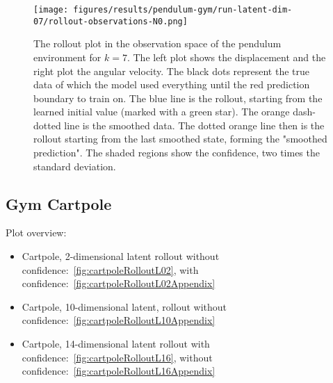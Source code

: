 		\begin{figure}
			\centering
			\texttt{[image: figures/results/pendulum-gym/run-latent-dim-07/rollout-observations-N0.png]}
			\caption[Rollout of the Gym pendulum experiment for 7 latent dimensions]{The rollout plot in the observation space of the pendulum environment for \(k = 7\). The left plot shows the displacement and the right plot the angular velocity. The black dots represent the true data of which the model used everything until the red prediction boundary to train on. The blue line is the rollout, starting from the learned initial value (marked with a green star). The orange dash-dotted line is the smoothed data. The dotted orange line then is the rollout starting from the last smoothed state, forming the "smoothed prediction". The shaded regions show the confidence, \ie two times the standard deviation.}
			\label{fig:gymPendulumRolloutL7}
		\end{figure}

	\subsection{Gym Cartpole}
		Plot overview:
		\begin{itemize}
			\item Cartpole, 2-dimensional latent rollout without confidence:~\autoref{fig:cartpoleRolloutL02}, with confidence:~\autoref{fig:cartpoleRolloutL02Appendix}
			\item Cartpole, 10-dimensional latent, rollout without confidence:~\autoref{fig:cartpoleRolloutL10Appendix}
			\item Cartpole, 14-dimensional latent rollout with confidence:~\autoref{fig:cartpoleRolloutL16}, without confidence:~\autoref{fig:cartpoleRolloutL16Appendix}
		\end{itemize}

